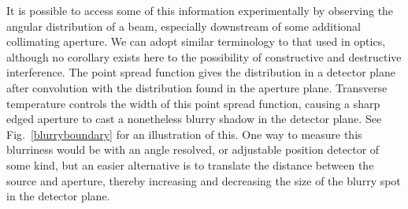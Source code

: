 It is possible to access some of this information experimentally by observing the angular distribution of a beam, especially downstream of some additional collimating aperture.
We can adopt similar terminology to that used in optics, although no corollary exists here to the possibility of constructive and destructive interference. 
The point spread function gives the distribution in a detector plane after convolution with the distribution found in the aperture plane. 
Transverse temperature controls the width of this point spread function, causing a sharp edged aperture to cast a nonetheless blurry shadow in the detector plane. 
See Fig.~\ref{blurryboundary} for an illustration of this.
One way to measure this blurriness would be with an angle resolved, or adjustable position detector of some kind, but an easier alternative is to translate the distance between the source and aperture, thereby increasing and decreasing the size of the blurry spot in the detector plane.

